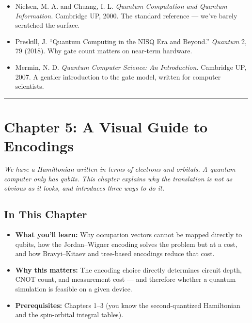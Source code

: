 \documentclass[
  11pt,
  oneside]{book}
\providecommand{\tightlist}{%
  \setlength{\itemsep}{0pt}\setlength{\parskip}{0pt}}
\begin{document}
\begin{itemize}
\tightlist
\item
  Nielsen, M. A. and Chuang, I. L. \emph{Quantum Computation and Quantum
  Information.} Cambridge UP, 2000. The standard reference --- we've
  barely scratched the surface.
\item
  Preskill, J. ``Quantum Computing in the NISQ Era and Beyond.''
  \emph{Quantum} 2, 79 (2018). Why gate count matters on near-term
  hardware.
\item
  Mermin, N. D. \emph{Quantum Computer Science: An Introduction.}
  Cambridge UP, 2007. A gentler introduction to the gate model, written
  for computer scientists.
\end{itemize}

\begin{center}\rule{0.5\linewidth}{0.5pt}\end{center}

\chapter{Chapter 5: A Visual Guide to
Encodings}\label{chapter-5-a-visual-guide-to-encodings}

\emph{We have a Hamiltonian written in terms of electrons and orbitals.
A quantum computer only has qubits. This chapter explains why the
translation is not as obvious as it looks, and introduces three ways to
do it.}

\section{In This Chapter}\label{in-this-chapter-4}

\begin{itemize}
\tightlist
\item
  \textbf{What you'll learn:} Why occupation vectors cannot be mapped
  directly to qubits, how the Jordan--Wigner encoding solves the problem
  but at a cost, and how Bravyi--Kitaev and tree-based encodings reduce
  that cost.
\item
  \textbf{Why this matters:} The encoding choice directly determines
  circuit depth, CNOT count, and measurement cost --- and therefore
  whether a quantum simulation is feasible on a given device.
\item
  \textbf{Prerequisites:} Chapters 1--3 (you know the second-quantized
  Hamiltonian and the spin-orbital integral tables).
\end{itemize}
\end{document}
